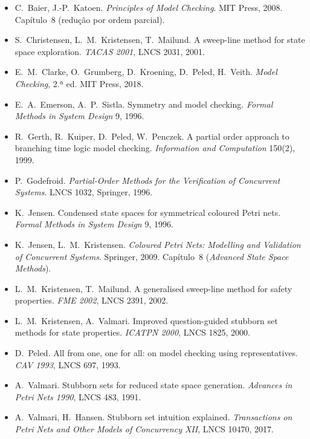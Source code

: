 \documentclass[11pt,a4paper]{report}
\theoremstyle{definition}
\begin{document}
\begin{itemize}[leftmargin=1.4em,itemsep=3pt]
\small
\item C.~Baier, J.-P.~Katoen. \emph{Principles of Model Checking}. MIT Press,
      2008. Capítulo~8 (redução por ordem parcial).
\item S.~Christensen, L.~M.~Kristensen, T.~Mailund. A sweep-line method for
      state space exploration. \emph{TACAS 2001}, LNCS 2031, 2001.
\item E.~M.~Clarke, O.~Grumberg, D.~Kroening, D.~Peled, H.~Veith.
      \emph{Model Checking}, 2.ª ed. MIT Press, 2018.
\item E.~A.~Emerson, A.~P.~Sistla. Symmetry and model checking.
      \emph{Formal Methods in System Design} 9, 1996.
\item R.~Gerth, R.~Kuiper, D.~Peled, W.~Penczek. A partial order approach to
      branching time logic model checking. \emph{Information and Computation}
      150(2), 1999.
\item P.~Godefroid. \emph{Partial-Order Methods for the Verification of
      Concurrent Systems}. LNCS 1032, Springer, 1996.
\item K.~Jensen. Condensed state spaces for symmetrical coloured Petri nets.
      \emph{Formal Methods in System Design} 9, 1996.
\item K.~Jensen, L.~M.~Kristensen. \emph{Coloured Petri Nets: Modelling and
      Validation of Concurrent Systems}. Springer, 2009. Capítulo~8
      (\emph{Advanced State Space Methods}).
\item L.~M.~Kristensen, T.~Mailund. A generalised sweep-line method for
      safety properties. \emph{FME 2002}, LNCS 2391, 2002.
\item L.~M.~Kristensen, A.~Valmari. Improved question-guided stubborn set
      methods for state properties. \emph{ICATPN 2000}, LNCS 1825, 2000.
\item D.~Peled. All from one, one for all: on model checking using
      representatives. \emph{CAV 1993}, LNCS 697, 1993.
\item A.~Valmari. Stubborn sets for reduced state space generation.
      \emph{Advances in Petri Nets 1990}, LNCS 483, 1991.
\item A.~Valmari, H.~Hansen. Stubborn set intuition explained.
      \emph{Transactions on Petri Nets and Other Models of Concurrency XII},
      LNCS 10470, 2017.
\end{itemize}
\end{document}
